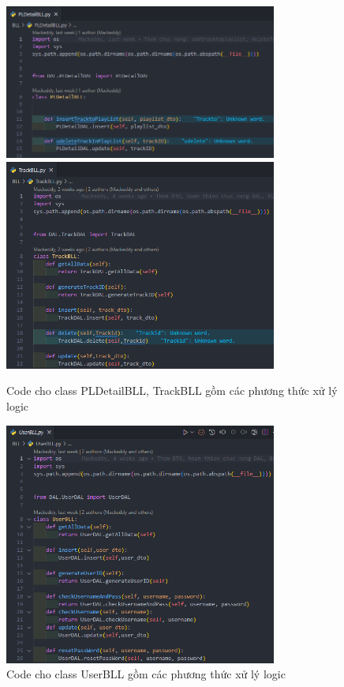 \documentclass[a4paper]{article}
\begin{document}
\clearpage
\newpage
\begin{figure}[h]
	\centering
	\includegraphics[width=0.8\textwidth]{images/PLDetailBLL.png}
	\includegraphics[width=0.8\textwidth]{images/TrackBLL.png}
	\caption{Code cho class PLDetailBLL, TrackBLL gồm các phương thức xử lý logic}
\end{figure}
\clearpage
\newpage
\begin{figure}[h]
	\centering
	\includegraphics[width=0.8\textwidth]{images/UserBLL.png}
	\caption{Code cho class UserBLL gồm các phương thức xử lý logic}
\end{figure}
\end{document}
